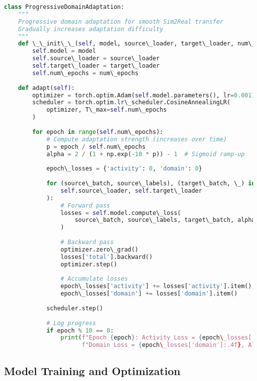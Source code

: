 \documentclass[journal]{IEEEtran}
\begin{document}
\begin{lstlisting}[language=Python, caption=Progressive Domain Adaptation Strategy]
class ProgressiveDomainAdaptation:
    """
    Progressive domain adaptation for smooth Sim2Real transfer
    Gradually increases adaptation difficulty
    """
    def \_\_init\_\_(self, model, source\_loader, target\_loader, num\_epochs=100):
        self.model = model
        self.source\_loader = source\_loader
        self.target\_loader = target\_loader
        self.num\_epochs = num\_epochs
        
    def adapt(self):
        optimizer = torch.optim.Adam(self.model.parameters(), lr=0.001)
        scheduler = torch.optim.lr\_scheduler.CosineAnnealingLR(
            optimizer, T\_max=self.num\_epochs
        )
        
        for epoch in range(self.num\_epochs):
            # Compute adaptation strength (increases over time)
            p = epoch / self.num\_epochs
            alpha = 2 / (1 + np.exp(-10 * p)) - 1  # Sigmoid ramp-up
            
            epoch\_losses = {'activity': 0, 'domain': 0}
            
            for (source\_batch, source\_labels), (target\_batch, \_) in zip(
                self.source\_loader, self.target\_loader
            ):
                # Forward pass
                losses = self.model.compute\_loss(
                    source\_batch, source\_labels, target\_batch, alpha
                )
                
                # Backward pass
                optimizer.zero\_grad()
                losses['total'].backward()
                optimizer.step()
                
                # Accumulate losses
                epoch\_losses['activity'] += losses['activity'].item()
                epoch\_losses['domain'] += losses['domain'].item()
            
            scheduler.step()
            
            # Log progress
            if epoch % 10 == 0:
                print(f"Epoch {epoch}: Activity Loss = {epoch\_losses['activity']:.4f}, "
                      f"Domain Loss = {epoch\_losses['domain']:.4f}, Alpha = {alpha:.3f}")
\end{lstlisting}

\subsection{Model Training and Optimization}
\end{document}
